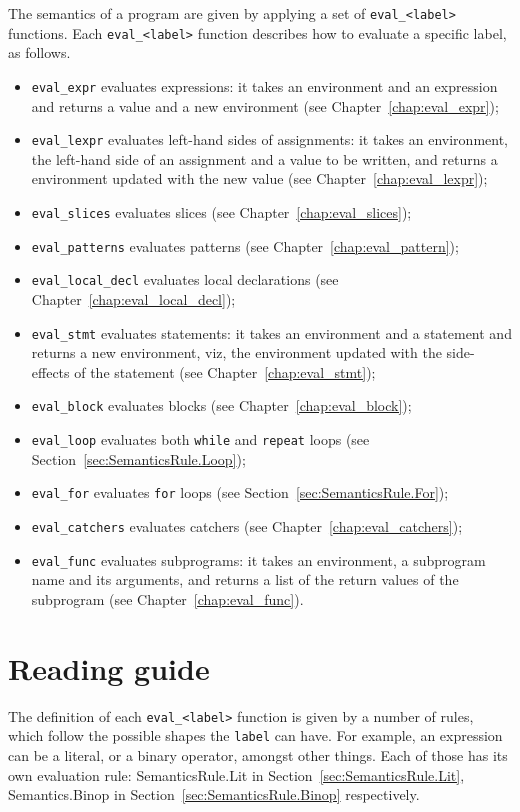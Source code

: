 \documentclass{book}
\begin{document}
The semantics of a program are given by applying a set of
\texttt{eval\_<label>} functions. Each \texttt{eval\_<label>} function
describes how to evaluate a specific label, as follows.
\begin{itemize}
\item \texttt{eval\_expr} evaluates expressions: it takes an
environment and an expression and returns a value and a
new environment (see Chapter~\ref{chap:eval_expr});
\item \texttt{eval\_lexpr} evaluates left-hand sides of assignments: it takes
an environment, the left-hand side of an assignment and a value to be written,
and returns a environment updated with the new value (see
Chapter~\ref{chap:eval_lexpr});
\item \texttt{eval\_slices} evaluates slices (see Chapter~\ref{chap:eval_slices});
\item \texttt{eval\_patterns} evaluates patterns (see Chapter~\ref{chap:eval_pattern});
\item \texttt{eval\_local\_decl} evaluates local declarations (see Chapter~\ref{chap:eval_local_decl});
\item \texttt{eval\_stmt} evaluates statements: it takes an
environment and a statement and returns a new
environment, viz, the environment updated with the side-effects
of the statement (see Chapter~\ref{chap:eval_stmt});
\item \texttt{eval\_block} evaluates blocks (see Chapter~\ref{chap:eval_block});
\item \texttt{eval\_loop} evaluates both \texttt{while} and \texttt{repeat} loops (see Section~\ref{sec:SemanticsRule.Loop});
\item \texttt{eval\_for} evaluates \texttt{for} loops (see Section~\ref{sec:SemanticsRule.For});
\item \texttt{eval\_catchers} evaluates catchers (see Chapter~\ref{chap:eval_catchers});
\item \texttt{eval\_func} evaluates subprograms: it takes an
environment, a subprogram name and its arguments, and returns a
list of the return values of the subprogram (see Chapter~\ref{chap:eval_func}).
\end{itemize}

\chapter{Reading guide}

The definition of each \texttt{eval\_<label>} function is given by a number of
rules, which follow the possible shapes the \texttt{label} can have. For
example, an expression can be a literal, or a binary operator, amongst other
things. Each of those has its own evaluation rule: SemanticsRule.Lit in
Section~\ref{sec:SemanticsRule.Lit}, Semantics.Binop in
Section~\ref{sec:SemanticsRule.Binop} respectively.
\end{document}
